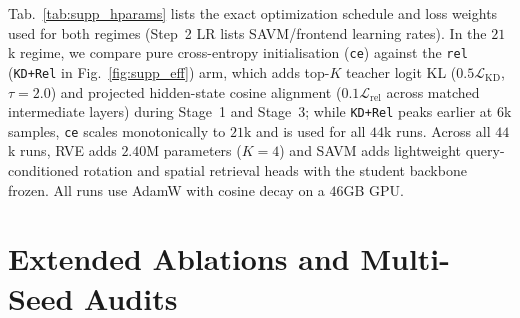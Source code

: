 \begin{table}[t]
\centering
\caption{\textbf{Training hyperparameters across stages} for the $21$k/$28$k
reference runs and the $44$k strictly audited runs ($1.7$B student,
$392{\times}392$ max resolution, $b{=}64$, $d_q{=}256$).}
\label{tab:supp_hparams}
\footnotesize
\renewcommand{\arraystretch}{1.22}
\setlength{\tabcolsep}{3.0pt}
\end{table}

Tab.~\ref{tab:supp_hparams} lists the exact optimization schedule and loss
weights used for both regimes (Step~2 LR lists SAVM/frontend learning rates).
In the $21$k regime, we compare pure cross-entropy initialisation (\texttt{ce})
against the \texttt{rel} (\texttt{KD+Rel} in Fig.~\ref{fig:supp_eff}) arm,
which adds top-$K$ teacher logit KL ($0.5\mathcal{L}_{\mathrm{KD}}$,
$\tau{=}2.0$) and projected hidden-state cosine alignment
($0.1\mathcal{L}_{\mathrm{rel}}$ across matched intermediate layers) during
Stage~1 and Stage~3; while \texttt{KD+Rel} peaks earlier at $6$k samples,
\texttt{ce} scales monotonically to $21$k and is used for all $44$k runs. Across
all $44$k runs, RVE adds $2.40$M parameters ($K{=}4$) and SAVM adds
lightweight query-conditioned rotation and spatial retrieval heads with the
student backbone frozen. All runs use AdamW with cosine decay on a $46$GB GPU.

\section{Extended Ablations and Multi-Seed Audits}
\label{sec:supp_abl}

